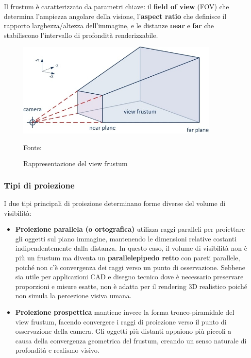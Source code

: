 Il frustum è caratterizzato da parametri chiave: il \textbf{field of view} (FOV) che determina l'ampiezza angolare della visione, l'\textbf{aspect ratio} che definisce il rapporto larghezza/altezza dell'immagine, e le distanze \textbf{near} e \textbf{far} che stabiliscono l'intervallo di profondità renderizzabile.

\begin{figure}[htbp]
    \centering
    \includegraphics[width=0.9\textwidth]{images/view_frustum.jpg}
    \caption{Rappresentazione del view frustum}
    Fonte: \cite{view_frustum}
\end{figure}

\subsubsection{Tipi di proiezione}

I due tipi principali di proiezione determinano forme diverse del volume di visibilità:

\begin{itemize}
 \item \textbf{Proiezione parallela (o ortografica)}  utilizza raggi paralleli per proiettare gli oggetti sul piano immagine, mantenendo le dimensioni relative costanti indipendentemente dalla distanza. In questo caso, il volume di visibilità non è più un frustum ma diventa un \textbf{parallelepipedo retto} con pareti parallele, poiché non c'è convergenza dei raggi verso un punto di osservazione. Sebbene sia utile per applicazioni CAD e disegno tecnico dove è necessario preservare proporzioni e misure esatte, non è adatta per il rendering 3D realistico poiché non simula la percezione visiva umana.
 \item \textbf{Proiezione prospettica} mantiene invece la forma tronco-piramidale del view frustum, facendo convergere i raggi di proiezione verso il punto di osservazione della camera. Gli oggetti più distanti appaiono più piccoli a causa della convergenza geometrica del frustum, creando un senso naturale di profondità e realismo visivo.
\end{itemize}



